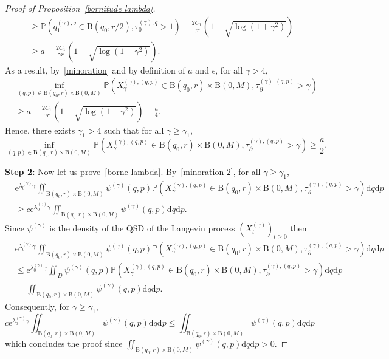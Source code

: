 \documentclass[preprint,EJP]{ejpecp}
\begin{document}
\begin{proof}[Proof of Proposition~\ref{bornitude lambda}]
\begin{align*}
    &\geq \mathbb{P}\left(\overline{q}^{(\gamma),q}_1\in \mathrm{B}(q_0,r/2),\overline{\tau}^{(\gamma),q}_0>1\right) - \frac{2 C_1}{\gamma r}(1+\sqrt{\log(1+\gamma^2)})\\
    &\geq a-\frac{2 C_1}{\gamma r}(1+\sqrt{\log(1+\gamma^2)}).  
\end{align*}
As a result, by~\eqref{minoration} and by definition of $a$ and $\epsilon$, for all $\gamma>4$,
\begin{align*}
    &\inf_{(q,p)\in\mathrm{B}(q_0,r)\times\mathrm{B}(0,M)}\mathbb{P}\left(X^{(\gamma),(q,p)}_{\gamma}\in \mathrm{B}(q_0,r)\times\mathrm{B}(0,M),\tau^{(\gamma),(q,p)}_{\partial}>\gamma\right)\\
    &\geq a-\frac{2 C_1}{\gamma r}(1+\sqrt{\log(1+\gamma^2)})-\frac{a}{4}.
\end{align*}
Hence, there exists $\gamma_1>4$ such that for all $\gamma\geq\gamma_1$,
$$\inf_{(q,p)\in\mathrm{B}(q_0,r)\times\mathrm{B}(0,M)}\mathbb{P}\left(X^{(\gamma),(q,p)}_{\gamma}\in \mathrm{B}(q_0,r)\times\mathrm{B}(0,M),\tau^{(\gamma),(q,p)}_{\partial}>\gamma\right)\geq\frac{a}{2}.$$

\noindent \textbf{Step 2:} Now let us prove~\eqref{borne lambda}. By~\eqref{minoration 2}, for all $\gamma\geq\gamma_1$,
\begin{align*}
    &\mathrm{e}^{\lambda_0^{(\gamma)}\gamma} \iint_{\mathrm{B}(q_0,r)\times\mathrm{B}(0,M)}\psi^{(\gamma)}(q,p) \mathbb{P}(X^{(\gamma),(q,p)}_{\gamma}\in \mathrm{B}(q_0,r)\times\mathrm{B}(0,M),\tau^{(\gamma),(q,p)}_{\partial}>\gamma) \mathrm{d}q \mathrm{d}p\\
    &\geq c \mathrm{e}^{\lambda_0^{(\gamma)}\gamma}\iint_{\mathrm{B}(q_0,r)\times\mathrm{B}(0,M)}\psi^{(\gamma)}(q,p) \mathrm{d}q \mathrm{d}p .
\end{align*}
Since $\psi^{(\gamma)}$ is the density of the QSD of the Langevin process $(X^{(\gamma)}_t)_{t\geq0}$ then 
\begin{align*}
    &\mathrm{e}^{\lambda_0^{(\gamma)}\gamma} \iint_{\mathrm{B}(q_0,r)\times\mathrm{B}(0,M)}\psi^{(\gamma)}(q,p) \mathbb{P}(X^{(\gamma),(q,p)}_{\gamma}\in \mathrm{B}(q_0,r)\times\mathrm{B}(0,M),\tau^{(\gamma),(q,p)}_{\partial}>\gamma) \mathrm{d}q \mathrm{d}p\\
    &\leq\mathrm{e}^{\lambda_0^{(\gamma)}\gamma} \iint_D\psi^{(\gamma)}(q,p) \mathbb{P}(X^{(\gamma),(q,p)}_{\gamma}\in \mathrm{B}(q_0,r)\times\mathrm{B}(0,M),\tau^{(\gamma),(q,p)}_{\partial}>\gamma) \mathrm{d}q \mathrm{d}p\\
    &=\iint_{\mathrm{B}(q_0,r)\times\mathrm{B}(0,M)}\psi^{(\gamma)}(q,p) \mathrm{d}q \mathrm{d}p .
\end{align*}
Consequently, for $\gamma\geq\gamma_1$,
$$c \mathrm{e}^{\lambda_0^{(\gamma)}\gamma}\iint_{\mathrm{B}(q_0,r)\times\mathrm{B}(0,M)}\psi^{(\gamma)}(q,p) \mathrm{d}q \mathrm{d}p\leq\iint_{\mathrm{B}(q_0,r)\times\mathrm{B}(0,M)}\psi^{(\gamma)}(q,p) \mathrm{d}q \mathrm{d}p$$
which concludes the proof since $\iint_{\mathrm{B}(q_0,r)\times\mathrm{B}(0,M)}\psi^{(\gamma)}(q,p) \mathrm{d}q \mathrm{d}p>0$.
\end{proof}  
\end{document}

